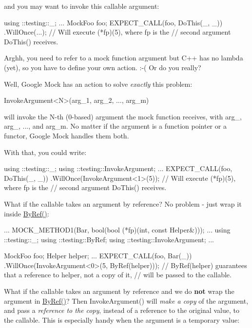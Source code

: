 and you may want to invoke this callable argument\+:


\begin{DoxyCode}
using ::testing::\_;
...
  MockFoo foo;
  EXPECT\_CALL(foo, DoThis(\_, \_))
      .WillOnce(...);
  // Will execute (*fp)(5), where fp is the
  // second argument DoThis() receives.
\end{DoxyCode}


Arghh, you need to refer to a mock function argument but C++ has no lambda (yet), so you have to define your own action. \+:-\/( Or do you really?

Well, Google Mock has an action to solve {\itshape exactly} this problem\+:


\begin{DoxyCode}
InvokeArgument<N>(arg\_1, arg\_2, ..., arg\_m)
\end{DoxyCode}


will invoke the {\ttfamily N}-\/th (0-\/based) argument the mock function receives, with {\ttfamily arg\+\_}, {\ttfamily arg\+\_}, ..., and {\ttfamily arg\+\_\+m}. No matter if the argument is a function pointer or a functor, Google Mock handles them both.

With that, you could write\+:


\begin{DoxyCode}
using ::testing::\_;
using ::testing::InvokeArgument;
...
  EXPECT\_CALL(foo, DoThis(\_, \_))
      .WillOnce(InvokeArgument<1>(5));
  // Will execute (*fp)(5), where fp is the
  // second argument DoThis() receives.
\end{DoxyCode}


What if the callable takes an argument by reference? No problem -\/ just wrap it inside {\ttfamily \hyperlink{namespacetesting_aaee6d42dcd69de6e7a1459c5c71222c3}{By\+Ref()}}\+:


\begin{DoxyCode}
...
  MOCK\_METHOD1(Bar, bool(bool (*fp)(int, const Helper&)));
...
using ::testing::\_;
using ::testing::ByRef;
using ::testing::InvokeArgument;
...

  MockFoo foo;
  Helper helper;
  ...
  EXPECT\_CALL(foo, Bar(\_))
      .WillOnce(InvokeArgument<0>(5, ByRef(helper)));
  // ByRef(helper) guarantees that a reference to helper, not a copy of it,
  // will be passed to the callable.
\end{DoxyCode}


What if the callable takes an argument by reference and we do {\bfseries not} wrap the argument in {\ttfamily \hyperlink{namespacetesting_aaee6d42dcd69de6e7a1459c5c71222c3}{By\+Ref()}}? Then {\ttfamily Invoke\+Argument()} will {\itshape make a copy} of the argument, and pass a {\itshape reference to the copy}, instead of a reference to the original value, to the callable. This is especially handy when the argument is a temporary value\+:


